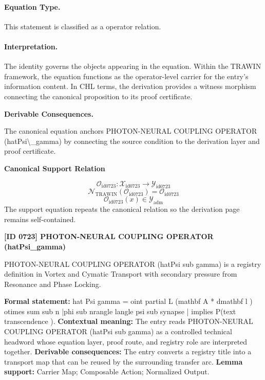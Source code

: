 \paragraph{Equation Type.}
This statement is classified as a operator relation.

\paragraph{Interpretation.}
The identity governs the objects appearing in the equation. Within the TRAWIN framework, the equation functions as the operator-level carrier for the entry’s information content. In CHL terms, the derivation provides a witness morphism connecting the canonical proposition to its proof certificate.

\par\vspace{0.35em}
\noindent\textbf{Derivable Consequences.}\quad
\begingroup
\footnotesize
\raggedright
The canonical equation anchors PHOTON-NEURAL COUPLING OPERATOR (hatPsi\textbackslash{}\_gamma) by connecting the source condition to the derivation layer and proof certificate.
\par\endgroup

\noindent\textbf{Canonical Support Relation}\par
\[
\mathcal{O}_{\mathrm{id0723}}:\mathcal{X}_{\mathrm{id0723}}\longrightarrow\mathcal{Y}_{\mathrm{id0723}}
\]
\[
\mathcal{N}_{\mathrm{TRAWIN}}(\mathcal{O}_{\mathrm{id0723}})=\mathcal{O}_{\mathrm{id0723}}
\]
\[
\mathcal{O}_{\mathrm{id0723}}(x)\in\mathcal{Y}_{\mathrm{adm}}
\]
\noindent The support equation repeats the canonical relation so the derivation page remains self-contained.\par

\clearpage
\noindent\textbf{[ID 0723] PHOTON-NEURAL COUPLING OPERATOR (hatPsi\_gamma)}\par
\vspace{0.35em}
\begingroup\small
{}
PHOTON-NEURAL COUPLING OPERATOR (hatPsi sub gamma) is a registry definition in Vortex and Cymatic Transport with secondary pressure from Resonance and Phase Locking.

\begingroup\footnotesize\setlength{\emergencystretch}{3em}\sloppy
\textbf{Formal statement:} hat Psi gamma = oint partial L (mathbf A * dmathbf l ) otimes sum sub n |phi sub nrangle langle psi sub synapse | implies P(text transcendence ). \textbf{Contextual meaning:} The entry reads PHOTON-NEURAL COUPLING OPERATOR (hatPsi sub gamma) as a controlled technical headword whose equation layer, proof route, and registry role are interpreted together. \textbf{Derivable consequences:} The entry converts a registry title into a transport map that can be reused by the surrounding transfer arc. \textbf{Lemma support:} Carrier Map; Composable Action; Normalized Output.\par
\endgroup

